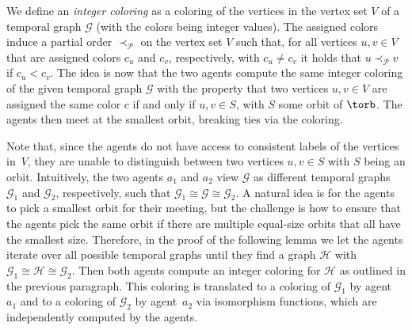We define an \textit{integer coloring} as a coloring of the vertices in the
vertex set $V$ of a temporal graph $\mathcal{G}$ (with the colors being integer
values). The assigned colors induce a partial order $\prec_\mathcal{P}$ on the
vertex set $V$ such that, for all vertices $u, v \in V$ that are assigned colors
$c_u$ and $c_v$, respectively, with $c_u\neq c_v$ it holds that $u
\prec_{\mathcal{P}} v$ if $c_u < c_v$. The idea is now that the two agents
compute the same integer coloring of the given temporal graph $\mathcal{G}$ with
the property that two vertices $u, v \in V$ are assigned the same color $c$ if
and only if $u, v \in S$, with $S$ some orbit of $\torb$. The agents then meet
at the smallest orbit, breaking ties via the coloring.

Note that, since the agents do not have access to consistent labels of the
vertices in~$V$, they are unable to distinguish between two vertices $u, v \in
S$ with $S$ being an orbit. Intuitively, the two agents $a_1$ and $a_2$ view
$\mathcal{G}$ as different temporal graphs $\mathcal{G}_1$ and $\mathcal{G}_2$,
respectively, such that
$\mathcal{G}_1\cong \mathcal{G}\cong \mathcal{G}_2$. A natural
idea is for the agents to pick a smallest orbit for their meeting, but the
challenge is how to ensure that the agents pick the same orbit if there are
multiple equal-size orbits that all have the smallest size. Therefore, in the
proof of the following lemma we let the agents iterate over all possible
temporal graphs until they find a graph $\mathcal{H}$ with
$\mathcal{G}_1\cong \mathcal{H}\cong \mathcal{G}_2$. Then both
agents compute an integer coloring for $\mathcal{H}$ as outlined in the previous
paragraph. This coloring is translated to a coloring of $\mathcal{G}_1$ by
agent~$a_1$ and to a coloring of $\mathcal{G}_2$ by agent~$a_2$ via isomorphism
functions, which are independently computed by the agents.

